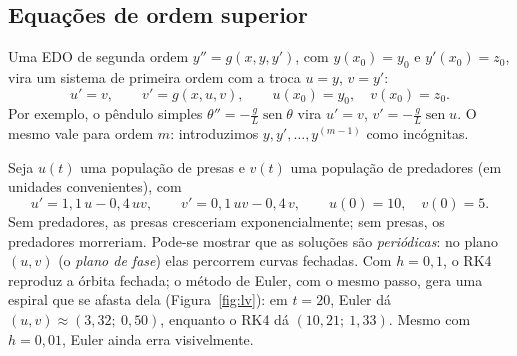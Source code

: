 \subsection{Equações de ordem superior}

Uma EDO de segunda ordem $y''=g(x,y,y')$, com $y(x_0)=y_0$ e $y'(x_0)=z_0$, vira um sistema de
primeira ordem com a troca $u=y$, $v=y'$:
\[
u'=v,\qquad v'=g(x,u,v),\qquad u(x_0)=y_0,\quad v(x_0)=z_0.
\]
Por exemplo, o pêndulo simples $\theta''=-\frac gL\operatorname{sen}\theta$ vira
$u'=v$, $v'=-\frac gL\operatorname{sen}u$. O mesmo vale para ordem $m$: introduzimos $y,y',\dots,y^{(m-1)}$
como incógnitas.

\begin{exemplo}
Seja $u(t)$ uma população de presas e $v(t)$ uma população de predadores (em unidades
convenientes), com
\[
u'=1{,}1\,u-0{,}4\,uv,\qquad v'=0{,}1\,uv-0{,}4\,v,\qquad u(0)=10,\quad v(0)=5.
\]
Sem predadores, as presas cresceriam exponencialmente; sem presas, os predadores morreriam.
Pode-se mostrar que as soluções são \emph{periódicas}: no plano $(u,v)$ (o \emph{plano de
fase}) elas percorrem curvas fechadas. Com $h=0{,}1$, o RK4 reproduz a órbita fechada; o
método de Euler, com o mesmo passo, gera uma espiral que se afasta dela
(Figura~\ref{fig:lv}): em $t=20$, Euler dá $(u,v)\approx(3{,}32;\ 0{,}50)$, enquanto o RK4 dá
$(10{,}21;\ 1{,}33)$. Mesmo com $h=0{,}01$, Euler ainda erra visivelmente.
\end{exemplo}

